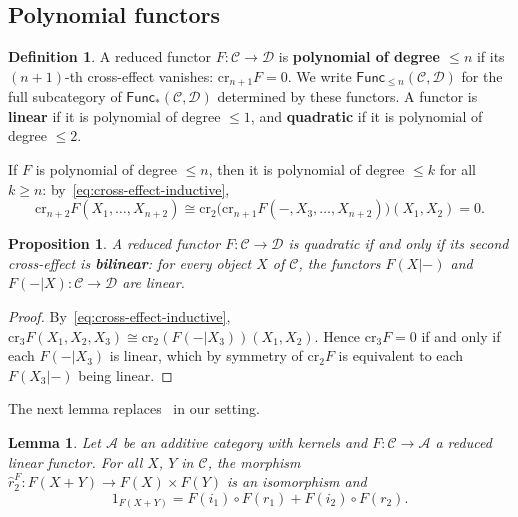 \documentclass[reqno,a4paper]{amsart}
\theoremstyle{plain}
\newtheorem{lemma}[subsection]{Lemma}
\newtheorem{proposition}[subsection]{Proposition}
\theoremstyle{definition}
\newtheorem{definition}[subsection]{Definition}
\newcommand{\defn}{\textbf}
\newcommand{\C}{\ensuremath{\mathcal{C}}}
\newcommand{\D}{\ensuremath{\mathcal{D}}}
\newcommand{\A}{\ensuremath{\mathcal{A}}}
\newcommand{\Func}{\ensuremath{\mathsf{Func}}}
\newcommand{\cre}{\ensuremath{\mathrm{cr}}}
\newcommand{\cmF}[2]{\ensuremath{\hat{r}^{#1}_{#2}}}       %
\begin{document}
\subsection{Polynomial functors}\label{sec:polynomial-functors}

\begin{definition}\label{def:polynomial}
  A reduced functor \(F\colon \C\to\D\) is \defn{polynomial of degree \(\leq n\)} if its \((n+1)\)-th cross-effect vanishes: \(\cre_{n+1}F=0\). We write \(\Func_{\leq n}(\C,\D)\) for the full subcategory of \(\Func_{*}(\C,\D)\) determined by these functors. A functor is \defn{linear} if it is polynomial of degree \(\leq 1\), and \defn{quadratic} if it is polynomial of degree \(\leq 2\).
\end{definition}

If \(F\) is polynomial of degree \(\leq n\), then it is polynomial of degree \(\leq k\) for all \(k\geq n\): by~\eqref{eq:cross-effect-inductive},
\[
  \cre_{n+2}F(X_{1},\dots,X_{n+2})\cong\cre_{2}\bigl(\cre_{n+1}F(-,X_{3},\dots,X_{n+2})\bigr)(X_{1},X_{2})=0\text{.}
\]

\begin{proposition}\label{prop:quadratic-iff-bilinear}
  A reduced functor \(F\colon \C\to\D\) is quadratic if and only if its second cross-effect is \defn{bilinear}: for every object \(X\) of \(\C\), the functors \(F(X|-)\) and \(F(-|X)\colon \C\to\D\) are linear.
\end{proposition}

\begin{proof}
  By~\eqref{eq:cross-effect-inductive}, \(\cre_{3}F(X_{1},X_{2},X_{3})\cong\cre_{2}(F(-|X_{3}))(X_{1},X_{2})\). Hence \(\cre_{3}F=0\) if and only if each \(F(-|X_{3})\) is linear, which by symmetry of \(\cre_{2}F\) is equivalent to each \(F(X_{3}|-)\) being linear.
\end{proof}

The next lemma replaces~\cite[Lemma~3.6]{Hartl-Vespa} in our setting.

\begin{lemma}\label{lem:linear-into-additive}
  Let \(\A\) be an additive category with kernels and \(F\colon \C\to\A\) a reduced linear functor. For all \(X\), \(Y\) in \(\C\), the morphism \(\cmF{F}{2}\colon F(X+Y)\to F(X)\times F(Y)\) is an isomorphism and
  \begin{equation}\label{eq:linear-biproduct}
    1_{F(X+Y)}=F(i_{1})\circ F(r_{1})+F(i_{2})\circ F(r_{2})\text{.}
  \end{equation}
\end{lemma}
\end{document}

